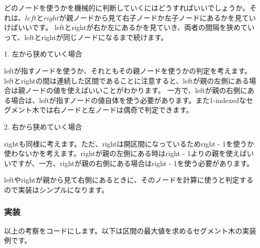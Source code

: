 \documentclass{jlreq}
\begin{document}
\vspace{1cm}

どのノードを使うかを機械的に判断していくにはどうすればいいでしょうか。それは、$left$と$right$が親ノードから見て右子ノードか左子ノードにあるかを見ていけばいいです。
leftとrightが右か左にあるかを見ていき、両者の間隔を狭めていって、leftとrightが同じノードになるまで続けます。

1. 左から狭めていく場合

leftが指すノードを使うか、それともその親ノードを使うかの判定を考えます。leftとrightの間は連続した区間であることに注意すると、leftが親の左側にある場合は親ノードの値を使えばいいことがわかります。
一方で、leftが親の右側にある場合は、leftが指すノードの値自体を使う必要があります。また1-indexedなセグメント木では右ノードと左ノードは偶奇で判定できます。

2. 右から狭めていく場合

rightも同様に考えます。ただ、rightは開区間になっているためright - 1を使うか使わないかを考えます。rightが親の左側にある時はright - 1よりの親を使えばいいですが、一方、rightが親の右側にある場合はright - 1を使う必要があります。

leftやrightが親から見て右側にあるときに、そのノードを計算に使うと判定するので実装はシンプルになります。

\subsubsection{実装}

以上の考察をコードにします。以下は区間の最大値を求めるセグメント木の実装例です。
\end{document}

